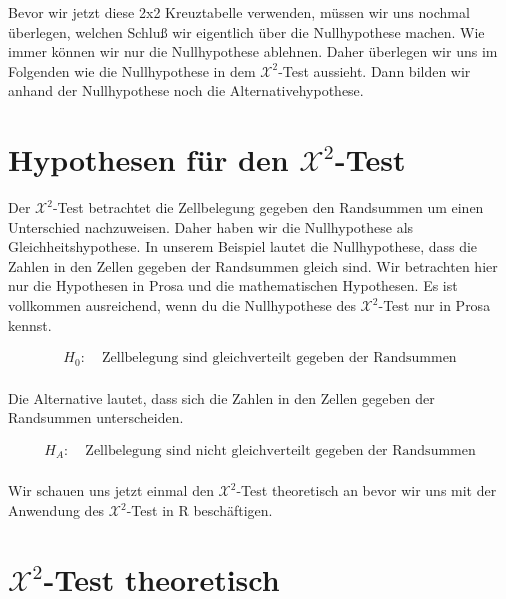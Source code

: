 \documentclass[
  letterpaper,
  DIV=11,
  oneside]{scrreport}
\begin{document}
Bevor wir jetzt diese 2x2 Kreuztabelle verwenden, müssen wir uns nochmal
überlegen, welchen Schluß wir eigentlich über die Nullhypothese machen.
Wie immer können wir nur die Nullhypothese ablehnen. Daher überlegen wir
uns im Folgenden wie die Nullhypothese in dem \(\mathcal{X}^2\)-Test
aussieht. Dann bilden wir anhand der Nullhypothese noch die
Alternativehypothese.

\hypertarget{hypothesen-fuxfcr-den-mathcalx2-test}{%
\section{\texorpdfstring{Hypothesen für den
\(\mathcal{X}^2\)-Test}{Hypothesen für den \textbackslash mathcal\{X\}\^{}2-Test}}\label{hypothesen-fuxfcr-den-mathcalx2-test}}

Der \(\mathcal{X}^2\)-Test betrachtet die Zellbelegung gegeben den
Randsummen um einen Unterschied nachzuweisen. Daher haben wir die
Nullhypothese als Gleichheitshypothese. In unserem Beispiel lautet die
Nullhypothese, dass die Zahlen in den Zellen gegeben der Randsummen
gleich sind. Wir betrachten hier nur die Hypothesen in Prosa und die
mathematischen Hypothesen. Es ist vollkommen ausreichend, wenn du die
Nullhypothese des \(\mathcal{X}^2\)-Test nur in Prosa kennst.

\begin{align*}
H_0: &\; \mbox{Zellbelegung sind gleichverteilt gegeben der Randsummen}\\
\end{align*}

Die Alternative lautet, dass sich die Zahlen in den Zellen gegeben der
Randsummen unterscheiden.

\begin{align*}
H_A: &\; \mbox{Zellbelegung sind nicht gleichverteilt gegeben der Randsummen}\\
\end{align*}

Wir schauen uns jetzt einmal den \(\mathcal{X}^2\)-Test theoretisch an
bevor wir uns mit der Anwendung des \(\mathcal{X}^2\)-Test in R
beschäftigen.

\hypertarget{mathcalx2-test-theoretisch}{%
\section{\texorpdfstring{\(\mathcal{X}^2\)-Test
theoretisch}{\textbackslash mathcal\{X\}\^{}2-Test theoretisch}}\label{mathcalx2-test-theoretisch}}
\end{document}
